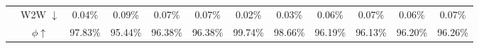 \begin{table}[t]
{\begin{tabular}{c|c|cc|cc|cc|cc|cc}
                                             & W2W $\downarrow$                    & 0.04\%      & 0.09\%      & 0.07\%     & 0.07\%      & 0.02\%             & 0.03\%              & 0.06\%       & 0.07\%        & 0.06\%     & 0.07\%      \\
                                             & $\phi \uparrow$                  & 97.83\%     & 95.44\%     & 96.38\%    & 96.38\%     & 99.74\%            & 98.66\%             & 96.19\%      & 96.13\%       & 96.20\%    & 96.26\%   \\
\midrule 
\bottomrule
\end{tabular}
}
\vspace{-.1in}
\end{table}
